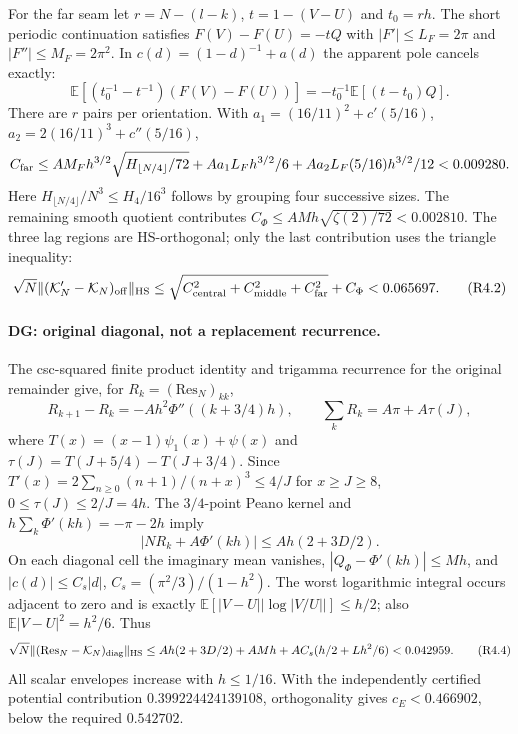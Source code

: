 For the far seam let $r=N-(l-k)$, $t=1-(V-U)$ and $t_0=rh$.
The short periodic continuation satisfies $F(V)-F(U)=-tQ$ with
$|F'|\le L_F=2\pi$ and $|F''|\le M_F=2\pi^2$. In
$c(d)=(1-d)^{-1}+a(d)$ the apparent pole cancels exactly:
\[
 \mathbb E[(t_0^{-1}-t^{-1})(F(V)-F(U))]
       =-t_0^{-1}\mathbb E[(t-t_0)Q].
\]
There are $r$ pairs per orientation. With
$a_1=(16/11)^2+c'(5/16)$, $a_2=2(16/11)^3+c''(5/16)$,
\[
 C_{\rm far}\le AM_Fh^{3/2}\sqrt{H_{\lfloor N/4\rfloor}/72}
 +Aa_1L_Fh^{3/2}/6+Aa_2L_F(5/16)h^{3/2}/12<0.009280.
\]
Here $H_{\lfloor N/4\rfloor}/N^3\le H_4/16^3$ follows by grouping four
successive sizes. The remaining smooth quotient contributes
$C_\Phi\le AMh\sqrt{\zeta(2)/72}<0.002810$. The three lag regions are
HS-orthogonal; only the last contribution uses the triangle inequality:
\[
 \sqrt N\| (\mathcal K'_N-\mathcal K_N)_{\rm off}\|_{\rm HS}
 \le\sqrt{C_{\rm central}^2+C_{\rm middle}^2+C_{\rm far}^2}+C_\Phi
 <0.065697.                                                   \tag{R4.2}
\]

\paragraph{DG: original diagonal, not a replacement recurrence.}
The csc-squared finite product identity and trigamma recurrence for the
original remainder give, for $R_k=(\mathrm{Res}_N)_{kk}$,
\[
 R_{k+1}-R_k=-Ah^2\Phi''((k+3/4)h),\qquad
 \sum_kR_k=A\pi+A\tau(J),
\]
where $T(x)=(x-1)\psi_1(x)+\psi(x)$ and
$\tau(J)=T(J+5/4)-T(J+3/4)$. Since
$T'(x)=2\sum_{n\ge0}(n+1)/(n+x)^3\le4/J$ for $x\ge J\ge8$,
$0\le\tau(J)\le2/J=4h$. The $3/4$-point Peano kernel and
$h\sum_k\Phi'(kh)=-\pi-2h$ imply
\[
 |NR_k+A\Phi'(kh)|\le Ah(2+3D/2).                           \tag{R4.3}
\]
On each diagonal cell the imaginary mean vanishes,
$|Q_\Phi-\Phi'(kh)|\le Mh$, and
$|c(d)|\le C_s|d|$, $C_s=(\pi^2/3)/(1-h^2)$.
The worst logarithmic integral occurs adjacent to zero and is exactly
$\mathbb E[|V-U||\log|V/U||]\le h/2$; also
$\mathbb E|V-U|^2=h^2/6$. Thus
\[
 \sqrt N\|(\mathrm{Res}_N-\mathcal K_N)_{\rm diag}\|_{\rm HS}
 \le Ah(2+3D/2)+AMh+AC_s(h/2+Lh^2/6)<0.042959.              \tag{R4.4}
\]
All scalar envelopes increase with $h\le1/16$. With the independently
certified potential contribution $0.399224424139108$, orthogonality gives
$c_E<0.466902$, below the required $0.542702$.

